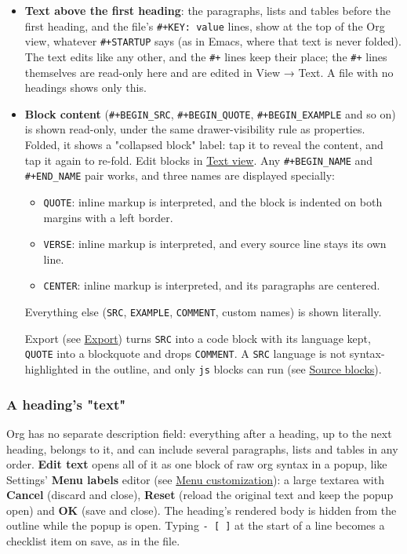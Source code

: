 \documentclass[11pt]{article}
\begin{document}
\begin{itemize}
Existing properties also show as a small read-only line under the heading while drawers are visible for it (\texttt{\#+STARTUP: showeverything}, or manually cycled to fully expanded; see \hyperref[sec:org4faaf88]{Folding and \#+STARTUP}). Tapping it opens the action menu.

\item \textbf{Text above the first heading}: the paragraphs, lists and tables before the first heading, and the file's \texttt{\#+KEY: value} lines, show at the top of the Org view, whatever \texttt{\#+STARTUP} says (as in Emacs, where that text is never folded). The text edits like any other, and the \texttt{\#+} lines keep their place; the \texttt{\#+} lines themselves are read-only here and are edited in View → Text. A file with no headings shows only this.
\item \textbf{Block content} (\texttt{\#+BEGIN\_SRC}, \texttt{\#+BEGIN\_QUOTE}, \texttt{\#+BEGIN\_EXAMPLE} and so on) is shown read-only, under the same drawer-visibility rule as properties. Folded, it shows a "collapsed block" label: tap it to reveal the content, and tap it again to re-fold. Edit blocks in \hyperref[sec:org0afb086]{Text view}. Any \texttt{\#+BEGIN\_NAME} and \texttt{\#+END\_NAME} pair works, and three names are displayed specially:
\begin{itemize}
\item \texttt{QUOTE}: inline markup is interpreted, and the block is indented on both margins with a left border.
\item \texttt{VERSE}: inline markup is interpreted, and every source line stays its own line.
\item \texttt{CENTER}: inline markup is interpreted, and its paragraphs are centered.
\end{itemize}

Everything else (\texttt{SRC}, \texttt{EXAMPLE}, \texttt{COMMENT}, custom names) is shown literally.

Export (see \hyperref[sec:org9a53e51]{Export}) turns \texttt{SRC} into a code block with its language kept, \texttt{QUOTE} into a blockquote and drops \texttt{COMMENT}. A \texttt{SRC} language is not syntax-highlighted in the outline, and only \texttt{js} blocks can run (see \hyperref[sec:org2fd54e4]{Source blocks}).
\end{itemize}

\subsubsection{A heading's "text"}
\label{sec:org670776d}
Org has no separate description field: everything after a heading, up to the next heading, belongs to it, and can include several paragraphs, lists and tables in any order. \textbf{Edit text} opens all of it as one block of raw org syntax in a popup, like Settings' \textbf{Menu labels} editor (see \hyperref[sec:orgc0b0953]{Menu customization}): a large textarea with \textbf{Cancel} (discard and close), \textbf{Reset} (reload the original text and keep the popup open) and \textbf{OK} (save and close). The heading's rendered body is hidden from the outline while the popup is open. Typing \texttt{- [ ]} at the start of a line becomes a checklist item on save, as in the file.
\end{document}
